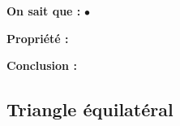 \documentclass[a4paper,10pt]{report}
\begin{document}
\begin{ex}
\medskip
\noindent \textbf{On sait que :} \hspace{6.7mm}$\bullet$ \dotfill \medskip %

\medskip
\noindent \textbf{Propriété :} \dotfill \medskip \medskip%

\dotfill 

\medskip
\noindent \textbf{Conclusion :} 

\medskip
\noindent\grandscarreaux{\linewidth}{4cm}%
\end{ex}

\subsection{Triangle équilatéral}
\end{document}
